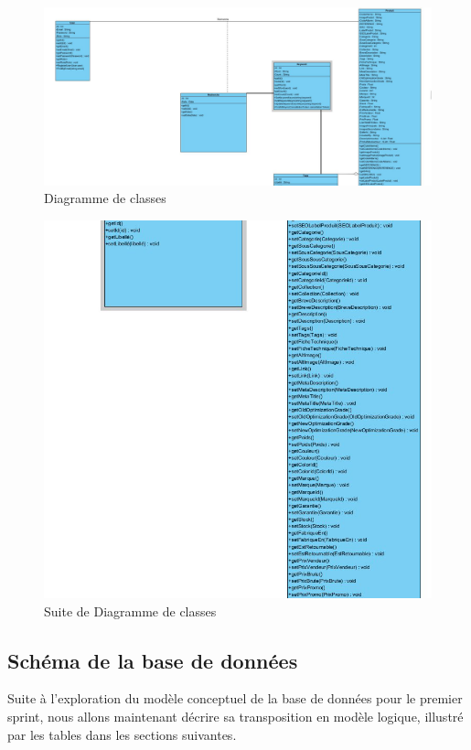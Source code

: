 \begin{figure}[H]
	\centering
	\includegraphics[width=1\textwidth]{logos/class.png}
	\caption{Diagramme de classes}
	\label{fig:diagclasses}
\end{figure}
\begin{figure}[H]
	\centering
	\includegraphics[width=1\textwidth]{logos/class2.png}
	\caption{Suite de Diagramme de classes}
	\label{fig:suitediagclasses}
\end{figure}


\subsection{Schéma de la base de données}
\noindent
Suite à l'exploration du modèle conceptuel de la base de données pour le premier
sprint, nous allons maintenant décrire sa transposition en modèle logique, illustré par les tables dans les sections suivantes.

